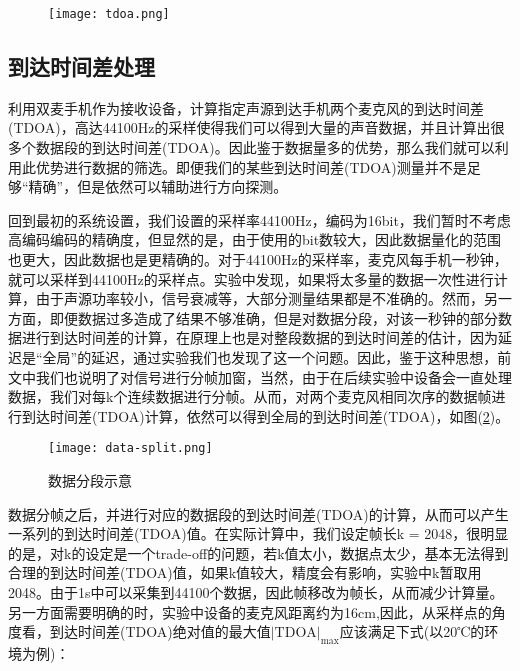 \documentclass[winfonts]{njuthesis}
\begin{document}
			\begin{figure}[H]
				\centering
				\texttt{[image: tdoa.png]} 
				\caption{{}}
				\label{fig: tdoa}
			\end{figure}
		
		\subsection{到达时间差处理}
		
		利用双麦手机作为接收设备，计算指定声源到达手机两个麦克风的到达时间差(TDOA)，高达44100Hz的采样使得我们可以得到大量的声音数据，并且计算出很多个数据段的到达时间差(TDOA)。因此鉴于数据量多的优势，那么我们就可以利用此优势进行数据的筛选。即便我们的某些到达时间差(TDOA)测量并不是足够“精确”，但是依然可以辅助进行方向探测。
		
		回到最初的系统设置，我们设置的采样率44100Hz，编码为16bit，我们暂时不考虑高编码编码的精确度，但显然的是，由于使用的bit数较大，因此数据量化的范围也更大，因此数据也是更精确的。对于44100Hz的采样率，麦克风每手机一秒钟，就可以采样到44100Hz的采样点。实验中发现，如果将太多量的数据一次性进行计算，由于声源功率较小，信号衰减等，大部分测量结果都是不准确的。然而，另一方面，即便数据过多造成了结果不够准确，但是对数据分段，对该一秒钟的部分数据进行到达时间差的计算，在原理上也是对整段数据的到达时间差的估计，因为延迟是“全局”的延迟，通过实验我们也发现了这一个问题。因此，鉴于这种思想，前文中我们也说明了对信号进行分帧加窗，当然，由于在后续实验中设备会一直处理数据，我们对每k个连续数据进行分帧。从而，对两个麦克风相同次序的数据帧进行到达时间差(TDOA)计算，依然可以得到全局的到达时间差(TDOA)，如图(\ref{fig: data-split})。
		
		\begin{figure}[H]
			\centering
			\texttt{[image: data-split.png]} 
			\caption{{数据分段示意}}
			\label{fig: data-split}
		\end{figure}
		
		数据分帧之后，并进行对应的数据段的到达时间差(TDOA)的计算，从而可以产生一系列的到达时间差(TDOA)值。在实际计算中，我们设定帧长k = 2048，很明显的是，对k的设定是一个trade-off的问题，若k值太小，数据点太少，基本无法得到合理的到达时间差(TDOA)值，如果k值较大，精度会有影响，实验中k暂取用2048。由于1s中可以采集到44100个数据，因此帧移改为帧长，从而减少计算量。另一方面需要明确的时，实验中设备的麦克风距离约为16cm,因此，从采样点的角度看，到达时间差(TDOA)绝对值的最大值$|\text{TDOA}|_{\text{max}}$应该满足下式(以20℃的环境为例)：
		
\end{document}
